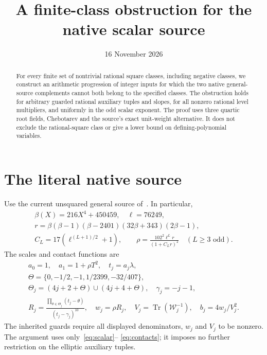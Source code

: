 \documentclass[11pt,a4paper]{article}
\title{A finite-class obstruction for the native scalar source}
\author{}\date{16 November 2026}
\DeclareMathOperator{\Tr}{Tr}\DeclareMathOperator{\Nm}{N}
\begin{document}
\maketitle
\begin{abstract}
For every finite set of nontrivial rational square classes, including
negative classes, we construct an arithmetic progression of integer
inputs for which the two native general-source complements cannot both
belong to the specified classes. The obstruction holds for arbitrary
guarded rational auxiliary tuples and slopes, for all nonzero rational
level multipliers, and uniformly in the odd scalar exponent. The proof
uses three quartic root fields, Chebotarev and the source's exact
unit-weight alternative. It does not exclude the rational-square class
or give a lower bound on defining-polynomial variables.
\end{abstract}

\section{The literal native source}
Use the current unsquared general source of~\cite{UnitNorm}. In particular,
\begin{equation}\label{eq:scalar}
\begin{gathered}
 \beta(X)=216X^4+450459,\quad\ell=76249,\\
 r=\beta(\beta-1)(\beta-2401)(32\beta+343)(2\beta-1),\\
 C_L=17(\ell^{(L+1)/2}+1),\qquad
 \rho=\frac{102^2\ell^Lr}{(1+C_Lr)^2}\quad(L\ge3\text{ odd}).
\end{gathered}
\end{equation}
The scales and contact functions are
\begin{equation}\label{eq:contacts}
\begin{gathered}
 a_0=1,\quad a_1=1+\rho T^2,\quad t_j=a_j\lambda,\\
 \Theta=\{0,-1/2,-1,1/2399,-32/407\},\\
 \Theta_j=(4j+2+\Theta)\cup(4j+4+\Theta),\quad\gamma_j=-j-1,\\
 R_j=\frac{\prod_{\theta\in\Theta_j}(t_j-\theta)}{(t_j-\gamma_j)^{10}},
 \quad w_j=\rho R_j,\quad
 V_j=\Tr(\mathcal W_j^{-1}),\quad b_j=4w_j/V_j^2.
\end{gathered}
\end{equation}
The inherited guards require all displayed denominators, $w_j$ and
$V_j$ to be nonzero. The argument uses only~\eqref{eq:scalar}--
\eqref{eq:contacts}; it imposes no further restriction on the
elliptic auxiliary tuples.
\end{document}
